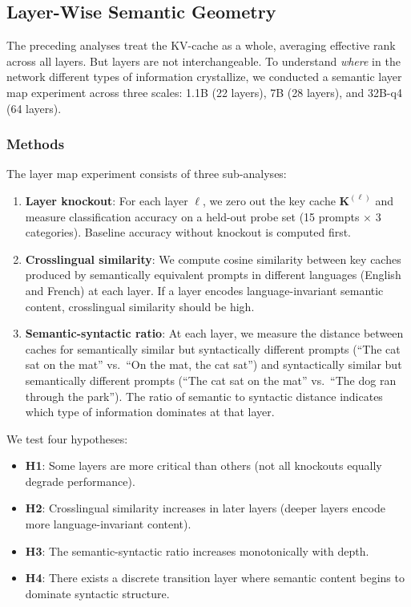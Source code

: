\documentclass[11pt,a4paper]{article}
\begin{document}
\subsection{Layer-Wise Semantic Geometry}
\label{sec:layer_map}

The preceding analyses treat the KV-cache as a whole, averaging effective rank across all layers. But layers are not interchangeable. To understand \emph{where} in the network different types of information crystallize, we conducted a semantic layer map experiment across three scales: 1.1B (22 layers), 7B (28 layers), and 32B-q4 (64 layers).

\subsubsection{Methods}

The layer map experiment consists of three sub-analyses:

\begin{enumerate}[leftmargin=*]
    \item \textbf{Layer knockout}: For each layer $\ell$, we zero out the key cache $\mathbf{K}^{(\ell)}$ and measure classification accuracy on a held-out probe set (15 prompts $\times$ 3 categories). Baseline accuracy without knockout is computed first.

    \item \textbf{Crosslingual similarity}: We compute cosine similarity between key caches produced by semantically equivalent prompts in different languages (English and French) at each layer. If a layer encodes language-invariant semantic content, crosslingual similarity should be high.

    \item \textbf{Semantic-syntactic ratio}: At each layer, we measure the distance between caches for semantically similar but syntactically different prompts (``The cat sat on the mat'' vs.\ ``On the mat, the cat sat'') and syntactically similar but semantically different prompts (``The cat sat on the mat'' vs.\ ``The dog ran through the park''). The ratio of semantic to syntactic distance indicates which type of information dominates at that layer.
\end{enumerate}

We test four hypotheses:
\begin{itemize}[leftmargin=*]
    \item \textbf{H1}: Some layers are more critical than others (not all knockouts equally degrade performance).
    \item \textbf{H2}: Crosslingual similarity increases in later layers (deeper layers encode more language-invariant content).
    \item \textbf{H3}: The semantic-syntactic ratio increases monotonically with depth.
    \item \textbf{H4}: There exists a discrete transition layer where semantic content begins to dominate syntactic structure.
\end{itemize}
\end{document}
